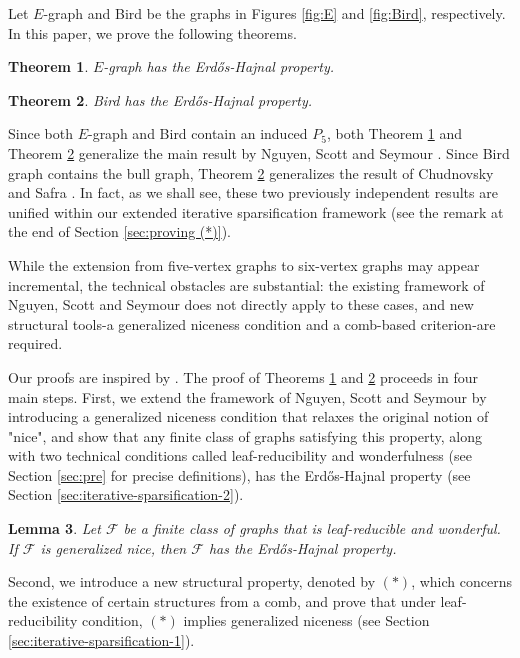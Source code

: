 \documentclass[a4paper,11pt]{article}
\newtheorem{theorem}{Theorem}[section]
\newtheorem{lemma}[theorem]{Lemma}
\begin{document}
    Let $E$-graph and Bird be the graphs in Figures \ref{fig:E} and \ref{fig:Bird}, respectively. 
    In this paper, we prove the following theorems. 
    \begin{theorem}\label{thm:E}
        $E$-graph has the Erd\H{o}s-Hajnal property. 
    \end{theorem}

    \begin{theorem}\label{thm:Bird}
        Bird has the Erd\H{o}s-Hajnal property. 
    \end{theorem}
    
    Since both $E$-graph and Bird contain an induced $P_5$, both Theorem \ref{thm:E} and Theorem \ref{thm:Bird} generalize the main result by Nguyen, Scott and Seymour \cite{NSS23}. Since Bird graph contains the bull graph, Theorem \ref{thm:Bird} generalizes the result of Chudnovsky and Safra \cite{CS08}. In fact, as we shall see, these two previously independent results are unified within our extended iterative sparsification framework (see the remark at the end of Section \ref{sec:proving (*)}).

    While the extension from five-vertex graphs to six-vertex graphs may appear incremental, the technical obstacles are substantial: the existing framework of Nguyen, Scott and Seymour does not directly apply to these cases, and new structural tools-a generalized niceness condition and a comb-based criterion-are required.
    
    Our proofs are inspired by \cite{NSS23}. 
    The proof of Theorems \ref{thm:E} and \ref{thm:Bird} proceeds in four main steps. First, 
    we extend the framework of Nguyen, Scott and Seymour \cite{NSS23} by introducing a generalized niceness condition that relaxes the original notion of "nice", and show that any finite class of graphs satisfying this property, along with two technical conditions called leaf-reducibility and wonderfulness (see Section \ref{sec:pre} for precise definitions), has the Erd\H{o}s-Hajnal property (see Section \ref{sec:iterative-sparsification-2}).
    
    \begin{lemma}\label{lem:reduce EH to gene-nice}
        Let $\mathcal{F}$ be a finite class of graphs that is leaf-reducible and wonderful. If $\mathcal{F}$ is generalized nice, then $\mathcal{F}$ has the Erd\H{o}s-Hajnal property. 
    \end{lemma}
    
    Second, we introduce a new structural property, denoted by  $(*)$, which concerns the existence of certain structures from a comb, and prove that under leaf-reducibility condition, $(*)$ implies generalized niceness (see Section \ref{sec:iterative-sparsification-1}). 
    
\end{document}
